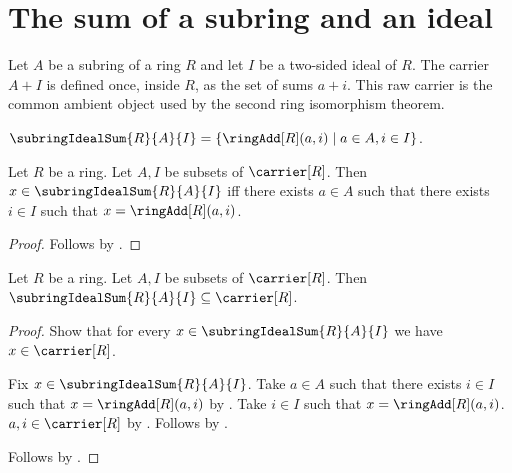 



\section{The sum of a subring and an ideal}

Let $A$ be a subring of a ring $R$ and let $I$ be a two-sided ideal of
$R$.  The carrier $A+I$ is defined once, inside $R$, as the set of sums
$a+i$.  This raw carrier is the common ambient object used by the second ring
isomorphism theorem.

\begin{definition}\label{subring_ideal_sum}
    $\subringIdealSum{R}{A}{I}
        =\{\ringAdd[R](a,i)\mid a\in A,i\in I\}$.
\end{definition}

\begin{proposition}\label{subring_ideal_sum_iff}
    Let $R$ be a ring.
    Let $A,I$ be subsets of $\carrier[R]$.
    Then $x\in\subringIdealSum{R}{A}{I}$ iff
        there exists $a\in A$ such that there exists $i\in I$ such that
            $x=\ringAdd[R](a,i)$.
\end{proposition}
\begin{proof}
    Follows by .
\end{proof}

\begin{proposition}\label{subring_ideal_sum_subseteq_carrier}
    Let $R$ be a ring.
    Let $A,I$ be subsets of $\carrier[R]$.
    Then $\subringIdealSum{R}{A}{I}\subseteq\carrier[R]$.
\end{proposition}
\begin{proof}
    Show that for every $x\in\subringIdealSum{R}{A}{I}$ we have
        $x\in\carrier[R]$.
    \begin{subproof}
        Fix $x\in\subringIdealSum{R}{A}{I}$.
        Take $a\in A$ such that there exists $i\in I$ such that
            $x=\ringAdd[R](a,i)$ by .
        Take $i\in I$ such that $x=\ringAdd[R](a,i)$.
        $a,i\in\carrier[R]$ by .
        Follows by .
    \end{subproof}
    Follows by .
\end{proof}

